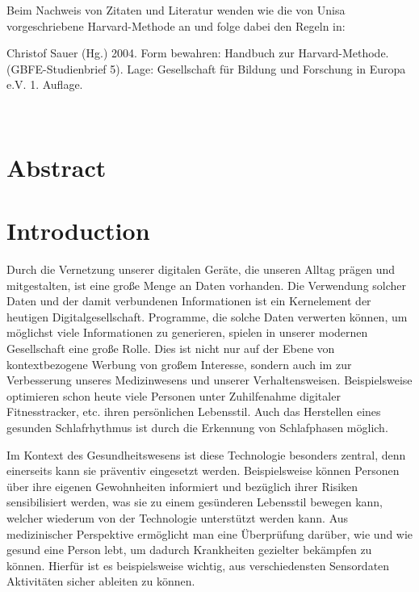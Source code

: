 \documentclass[a4paper,12pt]{scrartcl}
\begin{document}
\begin{singlespace}
\begin{titlepage}
\begin{flushright}
\begin{large}
\begin{tabular}{rl}
		\end{tabular}
		\end{large}	
\end{flushright}
	
\flushleft
\end{titlepage}

\newpage  \tableofcontents \thispagestyle{empty} \vspace{15mm}
\begin{center}
	\parbox{.8\linewidth}{\begin{small}
			{Beim Nachweis von Zitaten und Literatur wenden wie die von Unisa 
				vorgeschriebene Harvard-Methode an und folge dabei den Regeln 
				in: 
				
				Christof Sauer (Hg.) 2004. 
				Form bewahren: Handbuch zur 
				Harvard-Methode. 
				(GBFE-Studienbrief 5). Lage: Gesellschaft für 
				Bildung und Forschung in Europa e.V. 1. Auflage.} \\
			
			\end{small}}
\end{center}

\end{singlespace}
\newpage
\setcounter{page}{1}

\section*{Abstract}

\section{Introduction}
Durch die Vernetzung unserer digitalen Geräte, die unseren Alltag prägen und mitgestalten, ist eine große Menge an Daten vorhanden. Die Verwendung solcher Daten und der damit verbundenen Informationen ist ein Kernelement der heutigen Digitalgesellschaft. Programme, die solche Daten verwerten können, um möglichst viele Informationen zu generieren, spielen in unserer modernen Gesellschaft eine große Rolle. Dies ist nicht nur auf der Ebene von kontextbezogene Werbung von großem Interesse, sondern auch im zur Verbesserung unseres Medizinwesens und unserer Verhaltensweisen. Beispielsweise optimieren schon heute viele Personen unter Zuhilfenahme digitaler Fitnesstracker, etc. ihren persönlichen Lebensstil. Auch das Herstellen eines gesunden Schlafrhythmus ist durch die Erkennung von Schlafphasen möglich. 

Im Kontext des Gesundheitswesens ist diese Technologie besonders zentral, denn einerseits kann sie präventiv eingesetzt werden. Beispielsweise können Personen über ihre eigenen Gewohnheiten informiert und bezüglich ihrer Risiken sensibilisiert werden, was sie zu einem gesünderen Lebensstil bewegen kann, welcher wiederum von der Technologie unterstützt werden kann. Aus medizinischer Perspektive ermöglicht man eine Überprüfung darüber, wie und wie gesund eine Person lebt, um dadurch Krankheiten gezielter bekämpfen zu können. Hierfür ist es beispielsweise wichtig, aus verschiedensten Sensordaten Aktivitäten sicher ableiten zu können. 
\end{document}
